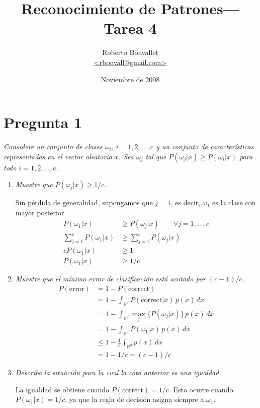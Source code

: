 \documentclass[spanish]{article}
\title{Reconocimiento de Patrones---Tarea 4}
\author{Roberto Bonvallet \\ \url {<rbonvall@gmail.com>}}
\date{Noviembre de 2008}
\newcommand{\pregunta}{\textit}
\newcommand{\given}{\vert}
\newcommand{\R}{\mathbb{R}}
\begin{document}
\maketitle

\section*{Pregunta 1}
\pregunta{
    Considere un conjunto de clases $\omega_i$, $i = 1, 2, \ldots, c$ y un conjunto de
    características representadas en el vector aleatorio $x$.  Sea $\omega_j$ tal que
    $P(\omega_j\given x)\ge P(\omega_i\given x)$ para todo $i = 1, 2, \ldots, c$.
}
\begin{enumerate}
    \item \pregunta{Muestre que $P(\omega_j\given x) \ge 1/c$.}

        Sin pérdida de generalidad, supongamos que $j = 1$, es decir, $\omega_1$ es la clase con
        mayor posterior.
        \begin{align}
            P(\omega_1\given x)   &\ge P(\omega_j\given x) \qquad\forall j = 1,\ldots, c \\
            \sum_{j=1}^c P(\omega_1\given x) &\ge \sum_{j=1}^c P(\omega_j\given x) \\
            c P(\omega_1\given x) &\ge 1 \\
            P(\omega_1\given x) &\ge 1/c 
        \end{align}

    \item \pregunta{Muestre que el mínimo error de clasificación está acotado por $(c - 1)/c$.}
        \begin{align}
            P(\text{error}) &= 1 - P(\text{correct}) \\
                &= 1 - \int_{\R^d} P(\text{correct}\given x)\,p(x)\,dx \\
                &= 1 - \int_{\R^d} \max_j \bigl\{ P(\omega_j\given x)\bigr\}\,p(x)\,dx \\
                &= 1 - \int_{\R^d} P(\omega_1\given x)\,p(x)\,dx \\
                &\le 1 - \frac{1}{c} \int_{\R^d} p(x)\,dx \\
                &= 1 - 1/c = (c - 1)/c
        \end{align}

    \item \pregunta{Describa la situación para la cual la cota anterior es una igualdad.}

        La igualdad se obtiene cuando $P(\text{correct}) = 1/c$.  Esto ocurre cuando
        $P(\omega_1\given x) = 1/c$, ya que la regla de decisión asigna siempre a $\omega_1$.


\end{enumerate}
\end{document}

